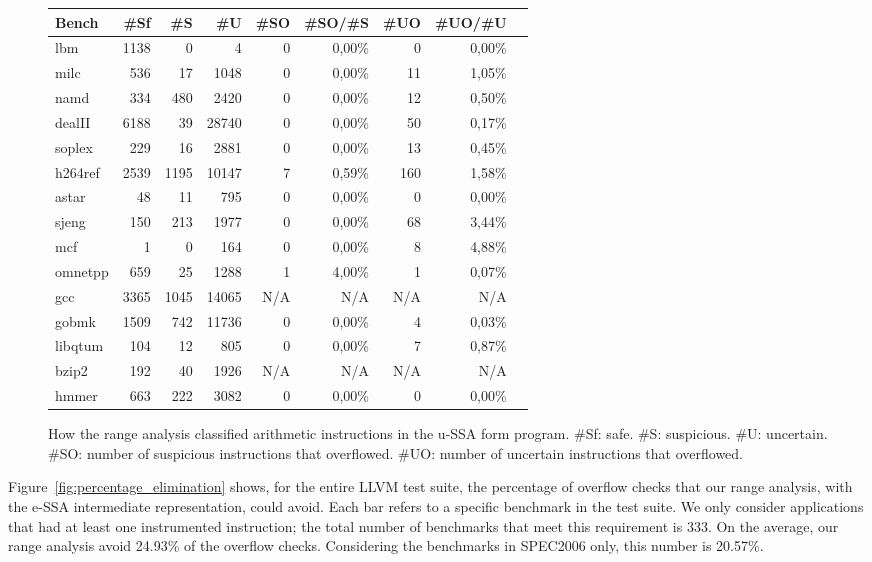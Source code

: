 \documentclass{sigplanconf}[10pt]
\begin{document}
\begin{figure}[t!]
\begin{center}
\begin{scriptsize}
\begin{tabular}{|l|r|r|r|r|r|r|r|r|}
\hline
Bench & \#Sf & \#S & \#U & \#SO & \#SO/\#S & \#UO & \#UO/\#U
\\ \hline
lbm     & 1138 & 0    & 4 & 0 & 0,00\% & 0 & 0,00\% \\ \hline
milc    & 536  & 17   & 1048  & 0 & 0,00\% & 11 & 1,05\% \\ \hline
namd    & 334  & 480  & 2420  & 0 & 0,00\% & 12 & 0,50\% \\ \hline
dealII  & 6188 & 39   & 28740  & 0 & 0,00\% & 50 & 0,17\% \\ \hline
soplex  & 229  & 16   & 2881 & 0 & 0,00\% & 13 & 0,45\% \\ \hline
h264ref & 2539 & 1195 & 10147 & 7 & 0,59\% & 160 & 1,58\% \\ \hline
astar   & 48   & 11   & 795 & 0 & 0,00\% & 0 & 0,00\% \\ \hline
sjeng   & 150  & 213  & 1977 &0 & 0,00\% & 68 & 3,44\% \\ \hline
mcf     & 1    & 0    & 164 & 0 & 0,00\% & 8 & 4,88\% \\ \hline
omnetpp & 659  & 25   & 1288 & 1 & 4,00\% & 1 & 0,07\% \\ \hline
gcc     & 3365 & 1045 & 14065 & N/A & N/A & N/A & N/A \\ \hline
gobmk   & 1509 & 742  & 11736 & 0 & 0,00\% & 4 & 0,03\% \\ \hline
libqtum & 104  & 12   & 805 & 0 & 0,00\% & 7 & 0,87\% \\ \hline
bzip2   & 192  & 40   & 1926 & N/A & N/A & N/A & N/A \\ \hline
hmmer   & 663  & 222  & 3082 & 0 & 0,00\% & 0 & 0,00\% \\ \hline
\end{tabular}
\end{scriptsize}
\end{center}
\caption{\label{fig:classificationTable}
How the range analysis classified arithmetic instructions in the 
u-SSA form program.
\#Sf: safe.
\#S: suspicious.
\#U: uncertain.
\#SO: number of suspicious instructions that overflowed.
\#UO: number of uncertain instructions that overflowed.
}
\end{figure}

Figure~\ref{fig:percentage_elimination} shows, for the entire LLVM test
suite, the percentage of overflow checks that our range analysis, with the
e-SSA intermediate representation, could avoid.
Each bar refers to a specific benchmark in the test suite.
We only consider applications that had at least one instrumented
instruction; the total number of benchmarks that meet this requirement is
333.
On the average, our range analysis avoid 24.93\% of the overflow checks.
Considering the benchmarks in SPEC2006 only, this number is 20.57\%.
\end{document}
